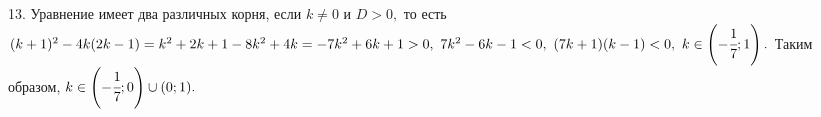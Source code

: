 13. Уравнение имеет два различных корня, если $k\neq0$ и $D>0,$ то есть $(k+1)^2-4k(2k-1)=k^2+2k+1-8k^2+4k=-7k^2+6k+1>0,\ 7k^2-6k-1<0,\ (7k+1)(k-1)<0,\ k\in\left(-\cfrac{1}{7};1\right).$ Таким образом, $k\in\left(-\cfrac{1}{7};0\right)\cup(0;1).$\\
